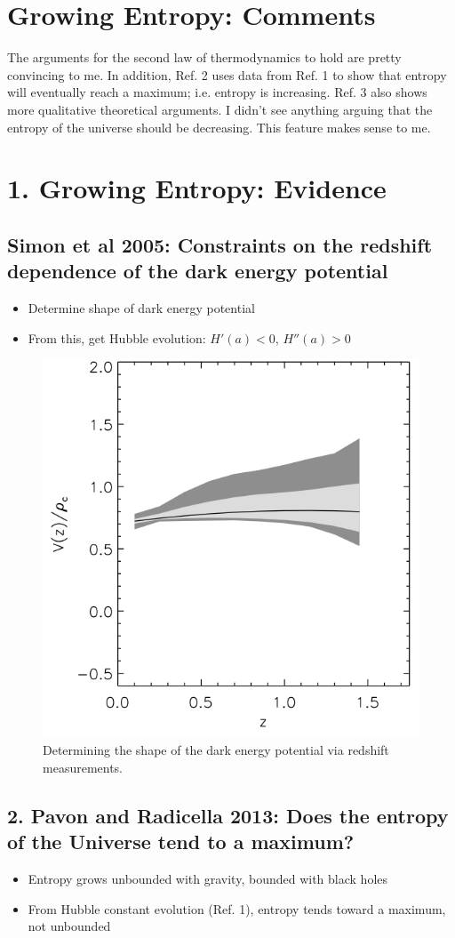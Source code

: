 \documentclass{article}
\begin{document}
\newpage
\section{Growing Entropy: Comments}
The arguments for the second law of thermodynamics to hold are pretty convincing to me. In addition, Ref. 2 uses data from Ref. 1 to show that entropy will eventually reach a maximum; i.e. entropy is increasing. Ref. 3 also shows more qualitative theoretical arguments. I didn't see anything arguing that the entropy of the universe should be decreasing. This feature makes sense to me. 

\newpage
\section*{1. Growing Entropy: Evidence}
\subsection*{Simon et al 2005: Constraints on the redshift dependence of the dark energy potential}
\begin{itemize}
\item Determine shape of dark energy potential
\item From this, get Hubble evolution: $H'(a)<0$, $H''(a)>0$
\end{itemize}

\begin{figure}[h]
\begin{center}
\includegraphics[width=.5\textwidth,angle=0.]{entropy1.png}
\end{center}
\caption{Determining the shape of the dark energy potential via redshift measurements.}
\end{figure}

\subsection*{2. Pavon and Radicella 2013: Does the entropy of the Universe tend to a maximum?}
\begin{itemize}
\item Entropy grows unbounded with gravity, bounded with black holes
\item From Hubble constant evolution (Ref. 1), entropy tends toward a maximum, not unbounded
\end{itemize}
\end{document}
